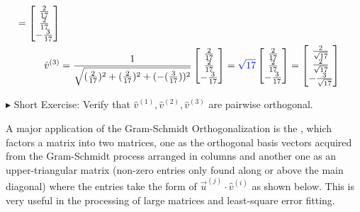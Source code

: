 \begin{solution}
\begin{align*}
=
\begin{bmatrix}
\frac{2}{17} \\
\frac{2}{17} \\
-\frac{3}{17}
\end{bmatrix}
\\
\hat{v}^{(3)} &= \frac{1}{\sqrt{(\frac{2}{17})^2 + (\frac{2}{17})^2 + (-(\frac{3}{17}))^2}}
\begin{bmatrix}
\frac{2}{17} \\
\frac{2}{17} \\
-\frac{3}{17}
\end{bmatrix}
=
\textcolor{blue}{\sqrt{17}}
\begin{bmatrix}
\frac{2}{17} \\
\frac{2}{17} \\
-\frac{3}{17}
\end{bmatrix}
=
\begin{bmatrix}
\frac{2}{\sqrt{17}} \\
\frac{2}{\sqrt{17}} \\
-\frac{3}{\sqrt{17}}
\end{bmatrix}
\end{align*}
\end{solution}
$\blacktriangleright$ Short Exercise: Verify that $\hat{v}^{(1)}, \hat{v}^{(2)}, \hat{v}^{(3)}$ are pairwise orthogonal.\footnotemark\par
A major application of the Gram-Schmidt Orthogonalization is the , which factors a matrix into two matrices, one as the orthogonal basis vectors acquired from the Gram-Schmidt process arranged in columns and another one as an upper-triangular matrix (non-zero entries only found along or above the main diagonal) where the entries take the form of $\vec{u}^{(j)} \cdot \hat{v}^{(i)}$ as shown below. This is very useful in the processing of large matrices and least-square error fitting.
